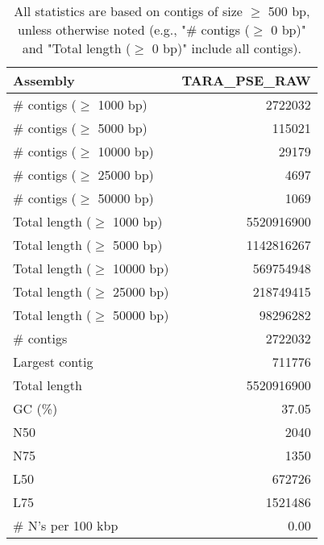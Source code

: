 \documentclass[12pt,a4paper]{article}
\begin{document}
\begin{table}[ht]
\begin{center}
\caption{All statistics are based on contigs of size $\geq$ 500 bp, unless otherwise noted (e.g., "\# contigs ($\geq$ 0 bp)" and "Total length ($\geq$ 0 bp)" include all contigs).}
\begin{tabular}{|l*{1}{|r}|}
\hline
Assembly & TARA\_PSE\_RAW \\ \hline
\# contigs ($\geq$ 1000 bp) & 2722032 \\ \hline
\# contigs ($\geq$ 5000 bp) & 115021 \\ \hline
\# contigs ($\geq$ 10000 bp) & 29179 \\ \hline
\# contigs ($\geq$ 25000 bp) & 4697 \\ \hline
\# contigs ($\geq$ 50000 bp) & 1069 \\ \hline
Total length ($\geq$ 1000 bp) & 5520916900 \\ \hline
Total length ($\geq$ 5000 bp) & 1142816267 \\ \hline
Total length ($\geq$ 10000 bp) & 569754948 \\ \hline
Total length ($\geq$ 25000 bp) & 218749415 \\ \hline
Total length ($\geq$ 50000 bp) & 98296282 \\ \hline
\# contigs & 2722032 \\ \hline
Largest contig & 711776 \\ \hline
Total length & 5520916900 \\ \hline
GC (\%) & 37.05 \\ \hline
N50 & 2040 \\ \hline
N75 & 1350 \\ \hline
L50 & 672726 \\ \hline
L75 & 1521486 \\ \hline
\# N's per 100 kbp & 0.00 \\ \hline
\end{tabular}
\end{center}
\end{table}
\end{document}
